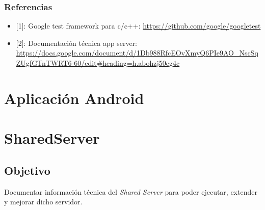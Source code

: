 \documentclass[a4paper,10pt,spanish]{sphinxmanual}
\begin{document}
\subsection{Referencias}
\label{testing:referencias}\begin{itemize}
\item {} 
{[}1{]}: Google test framework para c/c++: \url{https://github.com/google/googletest}

\item {} 
{[}2{]}: Documentación técnica app server: \url{https://docs.google.com/document/d/1Db988RfcEOvXmyQ6PIe9AO\_NscSqZUgfGTnTWRT6-60/edit\#heading=h.abohzj50eg4c}

\end{itemize}


\chapter{Aplicación Android}
\label{index:aplicacion-android}

\chapter{SharedServer}
\label{index:sharedserver}\label{index::doc}

\section{Objetivo}
\label{sharedServer:objetivo}\label{sharedServer::doc}
Documentar información técnica del \emph{Shared Server} para poder ejecutar, extender y mejorar dicho servidor.
\end{document}
